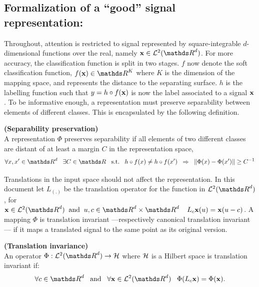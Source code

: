 \documentclass[a4paper,11pt]{report}
\begin{document}
      
		\subsection{Formalization of a ``good'' signal representation:}
      \label{sec:Intro/Signal rep/Formalization}
      
			Throughout, attention is restricted to signal represented by square-integrable $d$-dimensional functions over the real, namely $\bfx \in \mcalL^{2}(\dsR^{d})$. For more accuracy, the classification function is split in two stages. $f$ now denote the soft classification function, \ie $f(\bfx) \in \dsR^{K}$ where $K$ is the dimension of the mapping space, and represents the distance to the separating surface. $h$ is the labelling function such that $y=h \circ f({\bf x})$ is now the label associated to a signal ${\bf x}$. To be informative enough, a representation must preserve separability between elements of different classes. This is encapsulated by the following definition.
      
			\begin{defn} \textbf{(Separability preservation)}\\
				A representation $\Phi$ preserves separability if all elements of two different classes are distant of at least a margin $C$ in the representation space,
				\begin{equation*}
					\forall x,x' \in \dsR^{d} \;\;\; \exists C \in \dsR \;\;\; \st \;\;\; h \circ f(x) \neq h \circ f(x') \;\; \Rightarrow \;\; \norm{\Phi(x)-\Phi(x')} \geq C^{-1}
				\end{equation*}
				\label{def:Separability}
			\end{defn}
			
      Translations in the input space should not affect the representation. In this document let $L_{(.)}$ be the translation operator for the function in $\mcalL^{2}(\dsR^{d})$, \ie for $\bfx \in \mcalL^{2}(\dsR^{d}) \;\; \text{and} \;\; u,c \in \dsR^{d} \times \dsR^{d} \;\;\;\; L_{c}\bfx(u) = \bfx(u-c)$. A mapping $\Phi$ is translation invariant ---respectively canonical translation invariant--- if it maps a translated signal to the same point as its original version.

      \begin{defn} \textbf{(Translation invariance)}\\ 
				An operator $\Phi: \mcalL^{2}(\dsR^{d}) \rightarrow \mcalH$ where $\mathcal{H}$ is a Hilbert space is translation invariant if:
	      	\begin{equation*}
			  		\forall c \in \dsR^{d} 
			  		\;\;\; \text{and}  \;\;\;
			  		\forall \bfx \in \mcalL^{2}(\dsR^{d}) \;\;\;
			  		\Phi(L_{c}\bfx) = \Phi(\bfx).
				\end{equation*}
				\label{def:Translation invariance - intuition}
      \end{defn}
      \vspace{-30pt}
\end{document}
